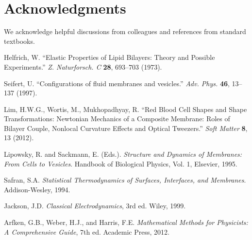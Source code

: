 \documentclass[12pt,a4paper]{article}
\begin{document}
\section*{Acknowledgments}

We acknowledge helpful discussions from colleagues and references from standard textbooks.

\begin{thebibliography}{9}

Helfrich, W. ``Elastic Properties of Lipid Bilayers: Theory and Possible Experiments.'' \textit{Z. Naturforsch. C} \textbf{28}, 693–703 (1973).

Seifert, U. ``Configurations of fluid membranes and vesicles.'' \textit{Adv. Phys.} \textbf{46}, 13–137 (1997).

Lim, H.W.G., Wortis, M., Mukhopadhyay, R. ``Red Blood Cell Shapes and Shape Transformations: Newtonian Mechanics of a Composite Membrane: Roles of Bilayer Couple, Nonlocal Curvature Effects and Optical Tweezers.'' \textit{Soft Matter} \textbf{8}, 13 (2012).

Lipowsky, R. and Sackmann, E. (Eds.). \textit{Structure and Dynamics of Membranes: From Cells to Vesicles}. Handbook of Biological Physics, Vol. 1, Elsevier, 1995.

Safran, S.A. \textit{Statistical Thermodynamics of Surfaces, Interfaces, and Membranes}. Addison-Wesley, 1994.

Jackson, J.D. \textit{Classical Electrodynamics}, 3rd ed. Wiley, 1999.

Arfken, G.B., Weber, H.J., and Harris, F.E. \textit{Mathematical Methods for Physicists: A Comprehensive Guide}, 7th ed. Academic Press, 2012.

\end{thebibliography}
\end{document}
